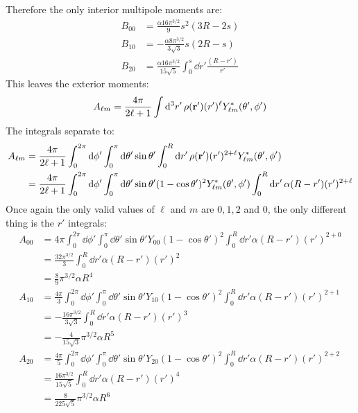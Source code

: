 \documentclass[12pt]{article}
\begin{document}
Therefore the only interior multipole moments are:
\begin{equation}
  \boxed{
  \begin{aligned}
    B_{00}&=\frac{\alpha16\pi^{3/2}}9s^2(3R-2s)\\
    B_{10}&=-\frac{\alpha8\pi^{3/2}}{3\sqrt{3}}s(2R-s)\\
    B_{20}&=\frac{\alpha16\pi^{3/2}}{15\sqrt{5}}\int_0^s\dd{r'}\frac{(R-r')}{r'}
  \end{aligned}
  }
\end{equation}
This leaves the exterior moments:
\begin{align*}
  A_{\ell m}=\frac{4\pi}{2\ell+1}\int\dd[3]{r'}
  \rho(\vb{r}')(r')^{\ell}Y_{\ell m}^*(\theta',\phi')
\end{align*}
The integrals separate to:
\begin{align*}
  A_{\ell m}&=\frac{4\pi}{2\ell+1}
  \int_0^{2\pi}\dd{\phi'}
  \int_0^\pi\dd{\theta'}\sin\theta'
  \int_0^R\dd{r'}
  \rho(\vb{r}')(r')^{2+\ell}Y_{\ell m}^*(\theta',\phi')\\
  &=\frac{4\pi}{2\ell+1}
  \int_0^{2\pi}\dd{\phi'}
  \int_0^\pi\dd{\theta'}\sin\theta'(1-\cos\theta')^2Y_{\ell m}^*(\theta',\phi')
  \int_0^R\dd{r'}\alpha(R-r')(r')^{2+\ell}
\end{align*}
Once again the only valid values of $\ell$ and $m$ are $0,1,2$ and $0$, the only different thing is the $r'$ integrals:
\begin{align*}
  A_{00}&=4\pi\int_0^{2\pi}\dd{\phi'}\int_0^\pi\dd{\theta'}\sin\theta'
  Y_{00}(1-\cos\theta')^2\int_0^R\dd{r'}\alpha(R-r')(r')^{2+0}\\
  &=\frac{32\pi^{3/2}}3\int_0^R\dd{r'}\alpha(R-r')(r')^{2}\\
  &=\frac89\pi^{3/2}\alpha R^4\\
  A_{10}&=\frac{4\pi}3\int_0^{2\pi}\dd{\phi'}\int_0^\pi\dd{\theta'}\sin\theta'
  Y_{10}(1-\cos\theta')^2\int_0^R\dd{r'}\alpha(R-r')(r')^{2+1}\\
  &=-\frac{16\pi^{3/2}}{3\sqrt{3}}\int_0^R\dd{r'}\alpha(R-r')(r')^{3}\\
  &=-\frac{4}{15\sqrt{3}}\pi^{3/2}\alpha R^5\\
  A_{20}&=\frac{4\pi}5\int_0^{2\pi}\dd{\phi'}\int_0^\pi\dd{\theta'}\sin\theta'
  Y_{20}(1-\cos\theta')^2\int_0^R\dd{r'}\alpha(R-r')(r')^{2+2}\\
  &=\frac{16\pi^{3/2}}{15\sqrt{5}}\int_0^R\dd{r'}\alpha(R-r')(r')^4\\
  &=\frac{8}{225\sqrt{5}}\pi^{3/2}\alpha R^6
\end{align*}
\end{document}
